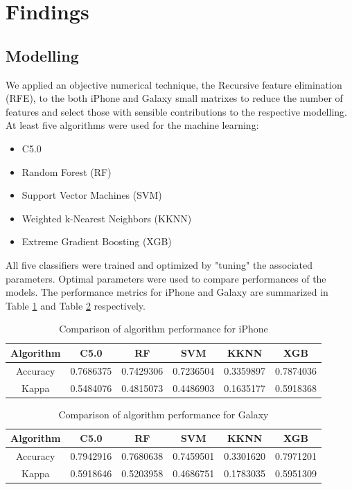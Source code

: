 \documentclass[12]{article}
\begin{document}
\section{Findings}
\subsection{Modelling}
We applied an objective numerical technique, the Recursive feature elimination (RFE), to the both iPhone and Galaxy small matrixes to reduce the number of features and select those with sensible contributions to the respective modelling. At least five algorithms were used for the machine learning:

\begin{itemize}
\item C5.0
\item Random Forest (RF)
\item Support Vector Machines (SVM)
\item Weighted k-Nearest Neighbors (KKNN)
\item Extreme Gradient Boosting (XGB)
\end{itemize}

All five classifiers were trained and optimized by "tuning" the associated  parameters. Optimal parameters were used to compare performances of the models. The performance metrics for iPhone and Galaxy are summarized in Table \ref{tab:Comp1} and Table \ref{tab:Comp2} respectively.
\\ 
\begin{table}[H]
\center
\begin{tabular}{c c c c c c}
\hline 
Algorithm & C5.0 & RF & SVM & KKNN & XGB \\ 
\hline \hline
Accuracy &  0.7686375 & 0.7429306 & 0.7236504 &  0.3359897 & 0.7874036\\ 
Kappa & 0.5484076 & 0.4815073 & 0.4486903 & 0.1635177 & 0.5918368\\ 
\hline
\end{tabular} 
\caption{Comparison of algorithm performance for iPhone}
\label{tab:Comp1}
\end{table}

\begin{table}[H]
\center
\begin{tabular}{c c c c c c}
\hline 
Algorithm & C5.0 & RF & SVM & KKNN & XGB \\ 
\hline \hline
Accuracy &  0.7942916 & 0.7680638 & 0.7459501 &  0.3301620 & 0.7971201\\ 
Kappa & 0.5918646 & 0.5203958 & 0.4686751 & 0.1783035 & 0.5951309\\ 
\hline
\end{tabular} 
\caption{Comparison of algorithm performance for Galaxy}
\label{tab:Comp2}
\end{table}
\end{document}

